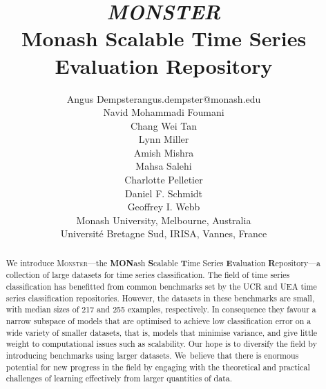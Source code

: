 \documentclass[twoside,11pt,preprint]{article}
\newcommand{\monster}{\textsc{Monster}}
\begin{document}
\vspace*{5ex}

\title{\textit{MONSTER}\\Monash Scalable Time Series Evaluation Repository}

\author{%
    \name Angus Dempster\footnotemark[1] \email angus.dempster@monash.edu \\
    \name Navid Mohammadi Foumani\footnotemark[1] \\ %
    \name Chang Wei Tan \\
    \name Lynn Miller\footnotemark[1] \\
    \name Amish Mishra\footnotemark[1] \\
    \name Mahsa Salehi\footnotemark[1] \\
    \name Charlotte Pelletier\footnotemark[2] \\
    \name Daniel F. Schmidt\footnotemark[1] \\
    \name Geoffrey I. Webb\footnotemark[1] \\
    \addr \footnotemark[1] Monash University, Melbourne, Australia \\
    \addr \footnotemark[2] Université Bretagne Sud, IRISA, Vannes, France
}


\maketitle


\begin{abstract}
    We introduce {\monster}---the \textbf{MON}ash \textbf{S}calable \textbf{T}ime Series \textbf{E}valuation \textbf{R}epository---a collection of large datasets for time series classification. The field of time series classification has benefitted from common benchmarks set by the UCR and UEA time series classification repositories. However, the datasets in these benchmarks are small, with median sizes of 217 and 255 examples, respectively. In consequence they favour a narrow subspace of models that are optimised to achieve low classification error on a wide variety of smaller datasets, that is, models that minimise variance, and give little weight to computational issues such as scalability. Our hope is to diversify the field by introducing benchmarks using larger datasets. We~believe that there is enormous potential for new progress in the field by engaging with the theoretical and practical challenges of learning effectively from larger quantities of data.
\end{abstract}
\end{document}
